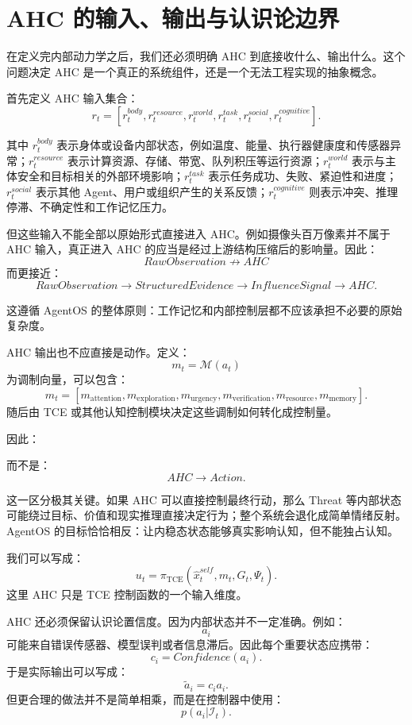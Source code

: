 \section{AHC 的输入、输出与认识论边界}

在定义完内部动力学之后，我们还必须明确 AHC 到底接收什么、输出什么。这个问题决定 AHC 是一个真正的系统组件，还是一个无法工程实现的抽象概念。

首先定义 AHC 输入集合：
\[
r_t
=
[
r_t^{body},
r_t^{resource},
r_t^{world},
r_t^{task},
r_t^{social},
r_t^{cognitive}
].
\]

其中 \(r_t^{body}\) 表示身体或设备内部状态，例如温度、能量、执行器健康度和传感器异常；\(r_t^{resource}\) 表示计算资源、存储、带宽、队列积压等运行资源；\(r_t^{world}\) 表示与主体安全和目标相关的外部环境影响；\(r_t^{task}\) 表示任务成功、失败、紧迫性和进度；\(r_t^{social}\) 表示其他 Agent、用户或组织产生的关系反馈；\(r_t^{cognitive}\) 则表示冲突、推理停滞、不确定性和工作记忆压力。

但这些输入不能全部以原始形式直接进入 AHC。例如摄像头百万像素并不属于 AHC 输入，真正进入 AHC 的应当是经过上游结构压缩后的影响量。因此：
\[
RawObservation
\not\rightarrow
AHC
\]
而更接近：
\[
RawObservation
\rightarrow
StructuredEvidence
\rightarrow
InfluenceSignal
\rightarrow
AHC.
\]

这遵循 AgentOS 的整体原则：工作记忆和内部控制层都不应该承担不必要的原始复杂度。

AHC 输出也不应直接是动作。定义：
\[
m_t
=
\mathcal M(a_t)
\]
为调制向量，可以包含：
\[
m_t=
[
m_{\mathrm{attention}},
m_{\mathrm{exploration}},
m_{\mathrm{urgency}},
m_{\mathrm{verification}},
m_{\mathrm{resource}},
m_{\mathrm{memory}}
].
\]
随后由 TCE 或其他认知控制模块决定这些调制如何转化成控制量。

因此：
\begin{statementbox}
\centering
{}
\end{statementbox}
而不是：
\[
AHC
\rightarrow
Action.
\]

这一区分极其关键。如果 AHC 可以直接控制最终行动，那么 Threat 等内部状态可能绕过目标、价值和现实推理直接决定行为；整个系统会退化成简单情绪反射。AgentOS 的目标恰恰相反：让内稳态状态能够真实影响认知，但不能独占认知。

我们可以写成：
\[
u_t
=
\pi_{\mathrm{TCE}}
(
\hat x_t^{self},
m_t,
G_t,
\Psi_t
).
\]
这里 AHC 只是 TCE 控制函数的一个输入维度。

AHC 还必须保留认识论置信度。因为内部状态并不一定准确。例如：
\[
a_i
\]
可能来自错误传感器、模型误判或者信息滞后。因此每个重要状态应携带：
\[
c_i
=
Confidence(a_i).
\]
于是实际输出可以写成：
\[
\tilde a_i
=
c_i a_i.
\]
但更合理的做法并不是简单相乘，而是在控制器中使用：
\[
p(a_i|\mathcal I_t).
\]

